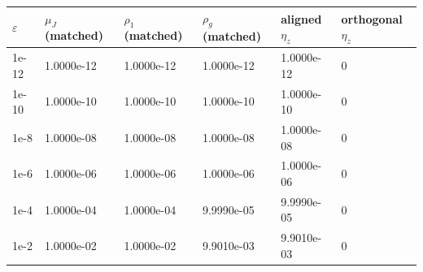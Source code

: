 \begin{tabularx}{0.98\textwidth}{@{}>{\raggedright\arraybackslash}p{}XXXXX@{}}
\toprule
$\varepsilon$ & $\mu_J$ (matched) & $\rho_1$ (matched) & $\rho_g$ (matched) & aligned $\eta_z$ & orthogonal $\eta_z$ \\
\midrule
1e-12 & 1.0000e-12 & 1.0000e-12 & 1.0000e-12 & 1.0000e-12 & 0 \\
1e-10 & 1.0000e-10 & 1.0000e-10 & 1.0000e-10 & 1.0000e-10 & 0 \\
1e-8 & 1.0000e-08 & 1.0000e-08 & 1.0000e-08 & 1.0000e-08 & 0 \\
1e-6 & 1.0000e-06 & 1.0000e-06 & 1.0000e-06 & 1.0000e-06 & 0 \\
1e-4 & 1.0000e-04 & 1.0000e-04 & 9.9990e-05 & 9.9990e-05 & 0 \\
1e-2 & 1.0000e-02 & 1.0000e-02 & 9.9010e-03 & 9.9010e-03 & 0 \\
\bottomrule
\end{tabularx}
